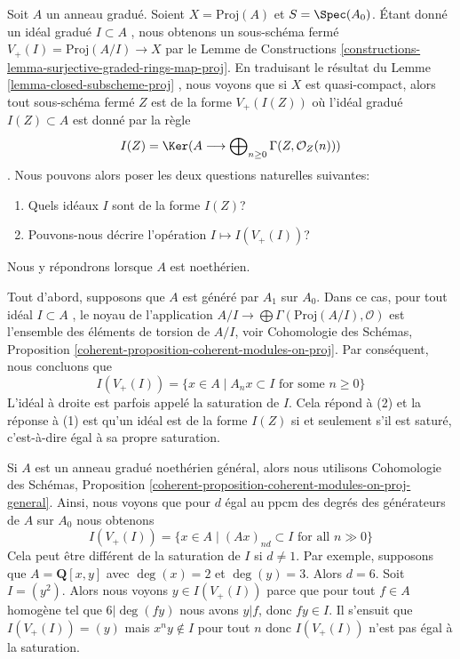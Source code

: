 \begin{example}
\label{example-closed-subscheme-of-proj}
Soit  $A$  un anneau gradué. Soient  $X = \text{Proj}(A)$  et  $S = \Spec(A_0)$. Étant
donné un idéal gradué  $I \subset A$ , nous obtenons un sous-schéma fermé
 $V_+(I) = \text{Proj}(A/I) \to X$  par le Lemme de Constructions  \ref{constructions-lemma-surjective-graded-rings-map-proj}. En traduisant le résultat
du Lemme  \ref{lemma-closed-subscheme-proj} , nous voyons que si  $X$  est quasi-compact, alors
tout sous-schéma fermé  $Z$  est de la forme  $V_+(I(Z))$  où l'idéal gradué
 $I(Z) \subset A$  est donné par la règle
$$
I(Z) = \Ker(A \longrightarrow
\bigoplus\nolimits_{n \geq 0} \Gamma(Z, \mathcal{O}_Z(n)))
$$
. Nous pouvons alors poser les deux questions naturelles suivantes:
\begin{enumerate}
\item Quels idéaux  $I$  sont de la forme  $I(Z)$?
\item Pouvons-nous décrire l'opération  $I \mapsto I(V_+(I))$?
\end{enumerate}
Nous y répondrons lorsque  $A$  est noethérien.

\medskip\noindent
Tout d'abord, supposons que  $A$  est généré par  $A_1$  sur
 $A_0$. Dans ce cas, pour tout idéal  $I \subset A$ , le noyau de l'application
 $A/I \to \bigoplus \Gamma(\text{Proj}(A/I), \mathcal{O})$  est l'ensemble des éléments de torsion de  $A/I$, voir
Cohomologie des Schémas, Proposition  \ref{coherent-proposition-coherent-modules-on-proj}. Par conséquent, nous concluons
que
$$
I(V_+(I)) = \{x \in A \mid A_n x \subset I\text{ for some }n \geq 0\}
$$
L'idéal à droite est parfois appelé la saturation de  $I$. Cela répond à
(2) et la réponse à (1) est qu'un idéal est de la forme  $I(Z)$  si et
seulement s'il est saturé, c'est-à-dire égal à sa propre saturation.

\medskip\noindent
Si  $A$  est un anneau gradué noethérien général, alors nous utilisons
Cohomologie des Schémas, Proposition  \ref{coherent-proposition-coherent-modules-on-proj-general}. Ainsi, nous voyons que pour
 $d$  égal au ppcm des degrés des générateurs de  $A$  sur
 $A_0$  nous obtenons
$$
I(V_+(I)) = \{x \in A \mid (Ax)_{nd} \subset I\text{ for all }n \gg 0\}
$$
Cela peut être différent de la saturation de  $I$  si  $d \not = 1$. Par
exemple, supposons que  $A = \mathbf{Q}[x, y]$  avec  $\deg(x) = 2$  et  $\deg(y) = 3$. Alors
 $d = 6$. Soit  $I = (y^2)$. Alors nous voyons  $y \in I(V_+(I))$  parce que pour
tout  $f \in A$  homogène tel que  $6 | \deg(fy)$  nous avons  $y | f$, donc
 $fy \in I$. Il s'ensuit que  $I(V_+(I)) = (y)$  mais  $x^n y \not \in I$  pour tout
 $n$  donc  $I(V_+(I))$  n'est pas égal à la saturation.
\end{example}

